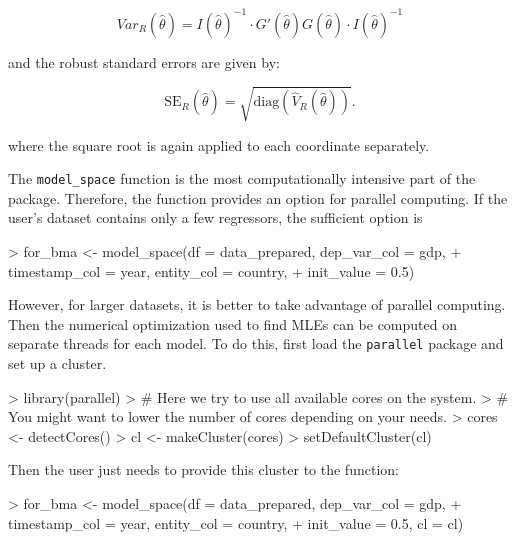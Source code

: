 \documentclass[a4paper]{article}
\begin{document}
\begin{equation}
Var_{R}(\hat{\theta}) = I(\hat{\theta})^{-1} \cdot G'(\hat{\theta}) G(\hat{\theta}) \cdot I(\hat{\theta})^{-1}
\end{equation}

\noindent and the robust standard errors are given by:

\begin{equation}
\text{SE}_{R}(\hat{\theta}) = \sqrt{\text{diag}(\hat{V}_{R}(\hat{\theta}))}.
\end{equation}

\noindent where the square root is again applied to each coordinate separately.

The \verb+model_space+ function is the most computationally intensive part of the package.
Therefore, the function provides an option for parallel computing.
If the user's dataset contains only a few regressors, the sufficient option is
\begin{Schunk}
\begin{Sinput}
> for_bma <- model_space(df = data_prepared, dep_var_col = gdp,
+                    timestamp_col = year, entity_col = country,
+                    init_value = 0.5)
\end{Sinput}
\end{Schunk}

\noindent However, for larger datasets,
it is better to take advantage of parallel computing.
Then the numerical optimization used to find MLEs
can be computed on separate threads for each model.
To do this, first load the \verb+parallel+ package and set up a cluster.

\begin{Schunk}
\begin{Sinput}
> library(parallel)
> # Here we try to use all available cores on the system.
> # You might want to lower the number of cores depending on your needs.
> cores <- detectCores()
> cl <- makeCluster(cores)
> setDefaultCluster(cl)
\end{Sinput}
\end{Schunk}

\noindent Then the user just needs to provide this cluster to the function:

\begin{Schunk}
\begin{Sinput}
> for_bma <- model_space(df = data_prepared, dep_var_col = gdp,
+                    timestamp_col = year, entity_col = country,
+                    init_value = 0.5, cl = cl)
\end{Sinput}
\end{Schunk}
\end{document}
